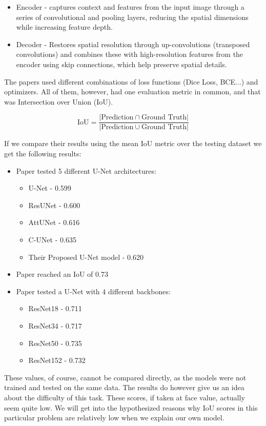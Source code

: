 \documentclass[12pt]{article}
\begin{document}
\begin{itemize}
    \item Encoder - captures context and features from the input image through a series of convolutional and pooling layers, reducing the spatial dimensions while increasing feature depth.
    \item Decoder - Restores spatial resolution through up-convolutions (transposed convolutions) and combines these with high-resolution features from the encoder using skip connections, which help preserve spatial details.
\end{itemize}

The papers used different combinations of loss functions (Dice Loss, BCE...) and optimizers. All of them, however, had one evaluation metric in common, and that was Intersection over Union (IoU).

\[
\text{IoU} = \frac{|\text{Prediction} \cap \text{Ground Truth}|}{|\text{Prediction} \cup \text{Ground Truth}|}
\]

If we compare their results using the mean IoU metric over the testing dataset we get the following results:

\begin{itemize}
    \item Paper \cite{ref1} tested 5 different U-Net architectures:
    \begin{itemize}
        \item U-Net - 0.599
        \item ResUNet - 0.600
        \item AttUNet - 0.616
        \item C-UNet - 0.635
        \item Their Proposed U-Net model - 0.620
    \end{itemize}
    \item Paper \cite{ref2} reached an IoU of 0.73
    \item Paper \cite{ref3} tested a U-Net with 4 different backbones:
    \begin{itemize}
        \item ResNet18 - 0.711
        \item ResNet34 - 0.717
        \item ResNet50 - 0.735
        \item ResNet152 - 0.732
    \end{itemize}
\end{itemize}

These values, of course, cannot be compared directly, as the models were not trained and tested on the same data. The results do however give us an idea about the difficulty of this task. These scores, if taken at face value, actually seem quite low. We will get into the hypothesized reasons why IoU scores in this particular problem are relatively low when we explain our own model.
\end{document}
